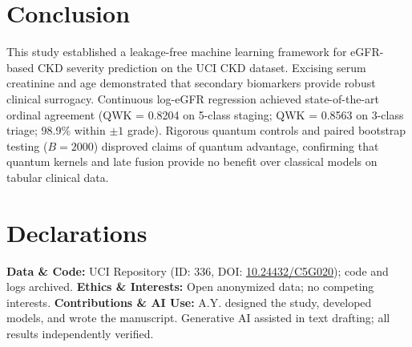 \documentclass[10pt,conference]{IEEEtran}
\begin{document}
\section{Conclusion}
This study established a leakage-free machine learning framework for eGFR-based CKD severity prediction on the UCI CKD dataset. Excising serum creatinine and age demonstrated that secondary biomarkers provide robust clinical surrogacy. Continuous log-eGFR regression achieved state-of-the-art ordinal agreement (QWK = 0.8204 on 5-class staging; QWK = 0.8563 on 3-class triage; 98.9\% within $\pm 1$ grade). Rigorous quantum controls and paired bootstrap testing ($B = 2000$) disproved claims of quantum advantage, confirming that quantum kernels and late fusion provide no benefit over classical models on tabular clinical data.

\section*{Declarations}
{\scriptsize
\noindent\textbf{Data \& Code:} UCI Repository (ID: 336, DOI: \url{10.24432/C5G020}); code and logs archived. \textbf{Ethics \& Interests:} Open anonymized data; no competing interests. \textbf{Contributions \& AI Use:} A.Y. designed the study, developed models, and wrote the manuscript. Generative AI assisted in text drafting; all results independently verified.
}

\balance
\end{document}
